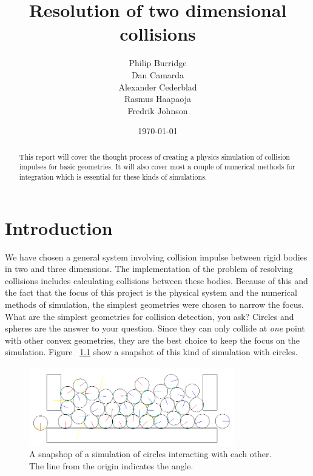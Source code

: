 \documentclass[a4paper,12pt]{report}
\title{Resolution of two dimensional collisions}
\author{Philip Burridge\\
        Dan Camarda\\
        Alexander Cederblad\\
        Rasmus Haapaoja\\
        Fredrik Johnson}
\date{\today}
\begin{document}
\maketitle


\begin{abstract}
This report will cover the thought process of creating a physics simulation of collision impulses for basic geometries. It will also cover most a couple of numerical methods for integration which is essential for these kinds of simulations.
\end{abstract}


\tableofcontents
{}


\chapter{Introduction}
\setcounter{page}{1}

We have chosen a general system involving collision impulse between rigid bodies in two and three dimensions. The implementation of the problem of resolving collisions includes calculating collisions between these bodies. Because of this and the fact that the focus of this project is the physical system and the numerical methods of simulation, the simplest geometries were chosen to narrow the focus. What are the simplest geometries for collision detection, you ask? Circles and spheres are the answer to your question. Since they can only collide at \emph{one} point with other convex geometries, they are the best choice to keep the focus on the simulation. Figure ~\ref{fig:snapshot} show a snapshot of this kind of simulation with circles.

\begin{figure}[!h]
    \centering
    \includegraphics[width=0.8\textwidth]{figures/snapshot.png}
    \caption{A snapshop of a simulation of circles interacting with each other. The line from the origin indicates the angle.}
    \label{fig:snapshot}
\end{figure}
\end{document}
